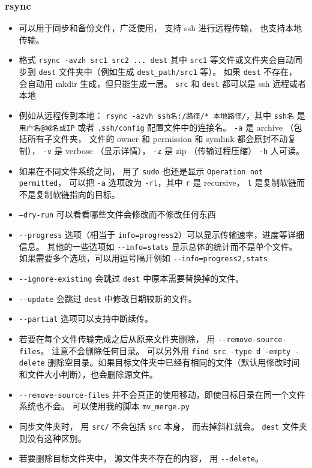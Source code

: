 \subsubsection{rsync}
\begin{itemize}
\item 可以用于同步和备份文件，广泛使用， 支持 ssh 进行远程传输， 也支持本地传输。
\item 格式 \verb`rsync -avzh src1 src2 ... dest` 其中 \verb`src1` 等文件或文件夹会自动同步到 \verb`dest` 文件夹中（例如生成 \verb`dest_path/src1` 等）。 如果 \verb`dest` 不存在， 会自动用 mkdir 生成，但只能生成一层。 \verb`src` 和 \verb`dest` 都可以是 ssh 远程或者本地
\item 例如从远程传到本地： \verb`rsync -azvh ssh名:/路径/* 本地路径/`，其中 \verb`ssh名` 是 \verb`用户名@域名或IP` 或者 \verb`.ssh/config` 配置文件中的连接名。 \verb`-a` 是 archive （包括所有子文件夹， 文件的 owner 和 permission 和 symlink 都会原封不动复制）， \verb`-v` 是 verbose （显示详情）， \verb`-z` 是 zip （传输过程压缩） \verb`-h` 人可读。
\item 如果在不同文件系统之间， 用了 \verb`sudo` 也还是显示 \verb`Operation not permitted`， 可以把 \verb`-a` 选项改为 \verb`-rl`，其中 \verb`r` 是 recursive， \verb`l` 是复制软链而不是复制软链指向的目标。
\item \verb`–dry-run` 可以看看哪些文件会修改而不修改任何东西
\item \verb`--progress` 选项（相当于 \verb`info=progress2`）可以显示传输速率，进度等详细信息。 其他的一些选项如 \verb`--info=stats` 显示总体的统计而不是单个文件。 如果需要多个选项，可以用逗号隔开例如 \verb`--info=progress2,stats`
\item \verb`--ignore-existing` 会跳过 \verb`dest` 中原本需要替换掉的文件。
\item \verb`--update` 会跳过 \verb`dest` 中修改日期较新的文件。
\item \verb`--partial` 选项可以支持中断续传。
\item 若要在每个文件传输完成之后从原来文件夹删除， 用 \verb`--remove-source-files`。 注意不会删除任何目录。 可以另外用 \verb`find src -type d -empty -delete` 删除空目录。如果目标文件夹中已经有相同的文件（默认用修改时间和文件大小判断），也会删除源文件。
\item \verb`--remove-source-files` 并不会真正的使用移动，即使目标目录在同一个文件系统也不会。 可以使用我的脚本 \verb`mv_merge.py`
\item 同步文件夹时， 用 \verb`src/` 不会包括 \verb`src` 本身， 而去掉斜杠就会。 \verb`dest` 文件夹则没有这种区别。
\item 若要删除目标文件夹中， 源文件夹不存在的内容， 用 \verb`--delete`。

\end{itemize}
